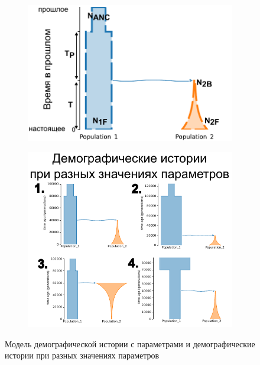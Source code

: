 \begin{figure}[ht]
    \centering
    \begin{subfigure}[c]{.5\textwidth}
    \includegraphics[width=\textwidth]{images_2/picture_2pops_model_1.pdf}
    \caption{}
    \label{fig:dadi:model_1}
    \end{subfigure}%
    \begin{subfigure}[c]{.49\textwidth}
    \includegraphics[width=\textwidth]{images_2/picture_2pops_model_1_2.pdf}
    \caption{}
    \label{fig:dadi:model_2}
    \end{subfigure}
    \caption{Модель демографической истории с параметрами и демографические истории при разных значениях параметров}
    \label{fig:dadi:model}
\end{figure}

